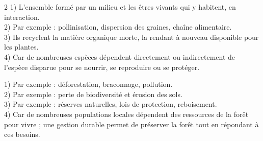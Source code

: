\begin{multicols}{2}
1) L'ensemble formé par un milieu et les êtres vivants qui y habitent, en
interaction.\\
2) Par exemple : pollinisation, dispersion des graines, chaîne alimentaire.\\
3) Ils recyclent la matière organique morte, la rendant à nouveau disponible pour les
plantes.\\
4) Car de nombreuses espèces dépendent directement ou indirectement de l'espèce
disparue pour se nourrir, se reproduire ou se protéger.

1) Par exemple : déforestation, braconnage, pollution.\\
2) Par exemple : perte de biodiversité et érosion des sols.\\
3) Par exemple : réserves naturelles, lois de protection, reboisement.\\
4) Car de nombreuses populations locales dépendent des ressources de la forêt pour
vivre ; une gestion durable permet de préserver la forêt tout en répondant à ces
besoins.

\end{multicols}
\exercicesBanner
